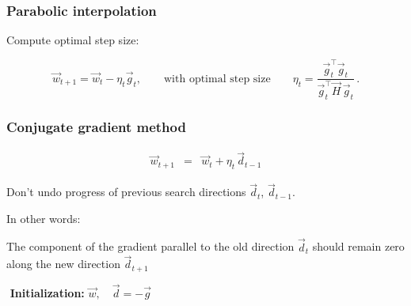 \begin{frame}\frametitle{Parabolic interpolation}


Compute optimal step size:

\begin{equation}
	  \vec{w}_{t+1} = \vec{w}_t - \eta_{t} \vec{g}_t,
	  \qquad \text{with optimal step size} \qquad
	  \eta_{t} = \frac{\vec{g}_t^\top\vec{g}_t}{\vec{g}_t^\top\vec{H}\,\vec{g}_t} \,.
\end{equation}

\end{frame}


\begin{frame}\frametitle{Conjugate gradient method}

		\begin{eqnarray}
			\vec{w}_{t+1}
			& =&  \vec{w}_t + \eta_t \, \vec{d}_{t-1}
		\end{eqnarray}

Don't undo progress of previous search directions $\vec d_{t}$, $\vec d_{t-1}$.

In other words:

The component of the gradient parallel to the old direction $\vec d_{t}$ should
remain zero along the new direction $\vec d_{t+1}$

\pause
	
	\begin{block}{$ $}
		\textbf{Initialization:} $\vec{w},\quad \vec{d} = - \vec{g}$\\
		\vspace{3mm}

	\end{block}

\end{frame}

